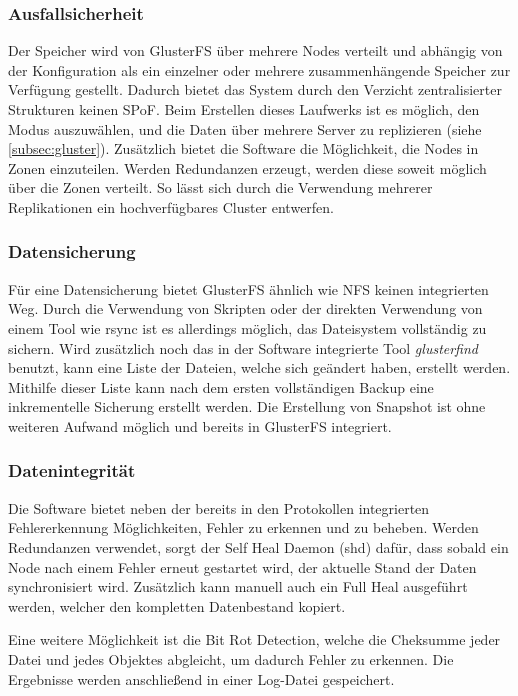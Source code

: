 \subsubsection{Ausfallsicherheit}
Der Speicher wird von GlusterFS über mehrere Nodes verteilt und abhängig von der Konfiguration als ein einzelner oder mehrere zusammenhängende Speicher zur Verfügung gestellt. Dadurch bietet das System durch den Verzicht zentralisierter Strukturen keinen \ac{SPoF}. Beim Erstellen dieses Laufwerks ist es möglich, den Modus auszuwählen, und die Daten über mehrere Server zu replizieren (siehe \ref{subsec:gluster}). Zusätzlich bietet die Software die Möglichkeit, die Nodes in Zonen einzuteilen. Werden Redundanzen erzeugt, werden diese soweit möglich über die Zonen verteilt. So lässt sich durch die Verwendung mehrerer Replikationen ein hochverfügbares Cluster entwerfen.

\subsubsection{Datensicherung}
Für eine Datensicherung bietet GlusterFS ähnlich wie NFS keinen integrierten Weg. Durch die Verwendung von Skripten oder der direkten Verwendung von einem Tool wie rsync ist es allerdings möglich, das Dateisystem vollständig zu sichern. Wird zusätzlich noch das in der Software integrierte Tool \textit{glusterfind} benutzt, kann eine Liste der Dateien, welche sich geändert haben, erstellt werden. Mithilfe dieser Liste kann nach dem ersten vollständigen Backup eine inkrementelle Sicherung erstellt werden.
Die Erstellung von Snapshot ist ohne weiteren Aufwand möglich und bereits in GlusterFS integriert.

\subsubsection{Datenintegrität}
Die Software bietet neben der bereits in den Protokollen integrierten Fehlererkennung Möglichkeiten, Fehler zu erkennen und zu beheben. Werden Redundanzen verwendet, sorgt der Self Heal Daemon (shd) dafür, dass sobald ein Node nach einem Fehler erneut gestartet wird, der aktuelle Stand der Daten synchronisiert wird. Zusätzlich kann manuell auch ein Full Heal ausgeführt werden, welcher den kompletten Datenbestand kopiert. \medskip

Eine weitere Möglichkeit ist die Bit Rot Detection, welche die Cheksumme jeder Datei und jedes Objektes abgleicht, um dadurch Fehler zu erkennen. Die Ergebnisse werden anschließend in einer Log-Datei gespeichert.


